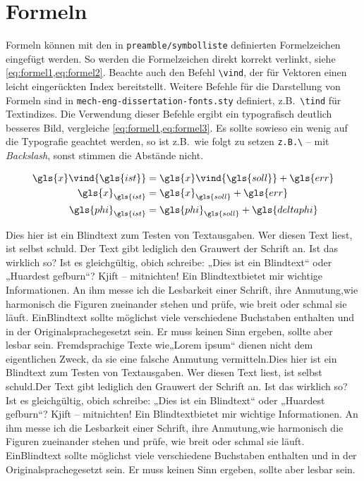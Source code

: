 
\chapter{Formeln} \label{sec:Formeln}

Formeln können mit den in \texttt{preamble/symbolliste} definierten Formelzeichen eingefügt werden. So werden die Formelzeichen direkt korrekt verlinkt, siehe \cref{eq:formel1,eq:formel2}. Beachte auch den Befehl \texttt{\textbackslash vind}, der für Vektoren einen leicht eingerückten Index bereitstellt. Weitere Befehle für die Darstellung von Formeln sind in \texttt{mech-eng-dissertation-fonts.sty} definiert, z.B.\ \texttt{\textbackslash tind} für Textindizes. Die Verwendung dieser Befehle ergibt ein typografisch deutlich besseres Bild, vergleiche \cref{eq:formel1,eq:formel3}. Es sollte sowieso ein wenig auf die Typografie geachtet werden, so ist z.B.\ wie folgt zu setzen \texttt{z.B.\textbackslash} -- mit \textit{Backslash}, sonst stimmen die Abstände nicht.

\begin{align}
	\label{eq:formel1}
	\gls{x}\vind{\gls{ist}} & = \gls{x}\vind{\gls{soll}} + \gls{err}    \\
	\label{eq:formel3}
	\gls{x}_{\gls{ist}}     & = \gls{x}_{\gls{soll}} + \gls{err}        \\
	\label{eq:formel2}
	\gls{phi}_{\gls{ist}}   & = \gls{phi}_{\gls{soll}} + \gls{deltaphi}
\end{align}

Dies hier ist ein Blindtext zum Testen von Textausgaben. Wer diesen Text liest, ist selbst schuld.
Der Text gibt lediglich den Grauwert der Schrift an. Ist das wirklich so? Ist es gleichgültig, obich schreibe:
„Dies ist ein Blindtext“ oder „Huardest gefburn“? Kjift – mitnichten! Ein Blindtextbietet mir wichtige Informationen. 
An ihm messe ich die Lesbarkeit einer Schrift, ihre Anmutung,wie harmonisch die Figuren zueinander stehen und prüfe, 
wie breit oder schmal sie läuft. EinBlindtext sollte möglichst viele verschiedene Buchstaben enthalten und in der 
Originalsprachegesetzt sein. Er muss keinen Sinn ergeben, sollte aber lesbar sein. Fremdsprachige Texte wie„Lorem ipsum“ 
dienen nicht dem eigentlichen Zweck, da sie eine falsche Anmutung vermitteln.Dies hier ist ein Blindtext zum Testen von 
Textausgaben. Wer diesen Text liest, ist selbst schuld.Der Text gibt lediglich den Grauwert der Schrift an. Ist das 
wirklich so? Ist es gleichgültig, obich schreibe: „Dies ist ein Blindtext“ oder „Huardest gefburn“? Kjift – mitnichten! 
Ein Blindtextbietet mir wichtige Informationen. An ihm messe ich die Lesbarkeit einer Schrift, ihre Anmutung,wie 
harmonisch die Figuren zueinander stehen und prüfe, wie breit oder schmal sie läuft. EinBlindtext sollte möglichst viele 
verschiedene Buchstaben enthalten und in der Originalsprachegesetzt sein. Er muss keinen Sinn ergeben, sollte aber lesbar 
sein.

